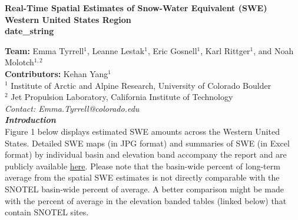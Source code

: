 \documentclass{article}
\begin{document}
\thispagestyle{firstpage}
\vspace*{3em}

\fontsize{14}{18}
\begin{center}
    \textbf{\textcolor[HTML]{1F497D}{
        Real-Time Spatial Estimates of Snow-Water Equivalent (SWE)\\
    }}
    \textbf{
        Western United States Region\\
        {{ date_string }}\\
        \vspace{1em}
    }
\end{center}

\fontsize{10}{14}
\noindent\textbf{Team:} Emma Tyrrell$^1$, Leanne Lestak$^1$, Eric Gosnell$^1$, Karl Rittger$^1$, and Noah Molotch$^{1,2}$\\
\noindent\textbf{Contributors:} Kehan Yang$^1$\\
$^1$ Institute of Arctic and Alpine Research, University of Colorado Boulder\\
$^2$ Jet Propulsion Laboratory, California Institute of Technology\\
\textit{Contact: Emma.Tyrrell@colorado.edu}\\

\fontsize{12}{16}
\noindent\textbf{\textit{Introduction}}\\
\fontsize{10}{14}
Figure 1 below displays estimated SWE amounts across the Western United States. Detailed SWE maps (in JPG format) and summaries of SWE (in Excel format) by individual basin and elevation band accompany the report and are publicly available \href{https://github.com/CU-Mountain-Hydrology/WestWide}{here}. Please note that the basin-wide percent of long-term average from the spatial SWE estimates is not directly comparable with the SNOTEL basin-wide percent of average. A better comparison might be made with the percent of average in the elevation banded tables (linked below) that contain SNOTEL sites.\\
\section*{}\label{fig:1a}\vspace{-4em}
\end{document}
